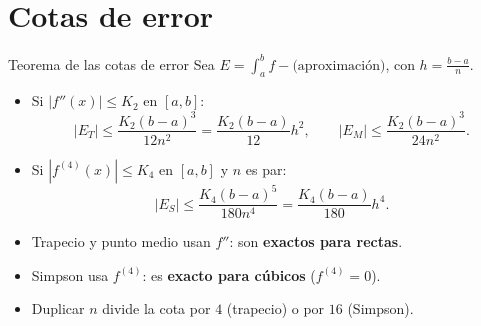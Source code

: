 \documentclass[10pt,aspectratio=169]{beamer}
\begin{document}
\section{Cotas de error}

\begin{frame}{Teorema de las cotas de error}
  Sea $E=\int_a^bf-\text{(aproximación)}$, con $h=\frac{b-a}{n}$.
  \begin{teorema}
    \begin{itemize}
      \item Si $|f''(x)|\le K_2$ en $[a,b]$:
        \[ |E_T|\le\frac{K_2(b-a)^3}{12n^2}=\frac{K_2(b-a)}{12}h^2,\qquad |E_M|\le\frac{K_2(b-a)^3}{24n^2}. \]
      \item Si $|f^{(4)}(x)|\le K_4$ en $[a,b]$ y $n$ es par:
        \[ |E_S|\le\frac{K_4(b-a)^5}{180n^4}=\frac{K_4(b-a)}{180}h^4. \]
    \end{itemize}
  \end{teorema}
  \begin{idea}
    \begin{itemize}
      \item Trapecio y punto medio usan $f''$: son \textbf{exactos para rectas}.
      \item Simpson usa $f^{(4)}$: es \textbf{exacto para cúbicos} ($f^{(4)}=0$).
      \item Duplicar $n$ divide la cota por $4$ (trapecio) o por $16$ (Simpson).
    \end{itemize}
  \end{idea}
\end{frame}
\end{document}
